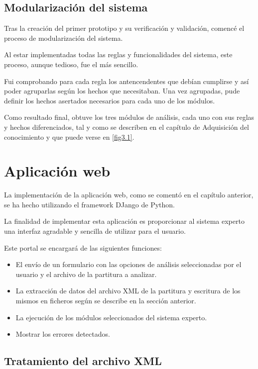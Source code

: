 \subsection{Modularización del sistema}

Tras la creación del primer prototipo y su verificación y validación, comencé el proceso de modularización del sistema. 

Al estar implementadas todas las reglas y funcionalidades del sistema, este proceso, aunque tedioso, fue el más sencillo. 

Fui comprobando para cada regla los antencendentes que debían cumplirse y así poder agruparlas según los hechos que necesitaban.
Una vez agrupadas, pude definir los hechos asertados necesarios para cada uno de los módulos.

Como resultado final, obtuve los tres módulos de análisis, cada uno con sus reglas y hechos diferenciados, tal y como se describen en el capítulo de Adquisición del conocimiento y que puede verse en \ref{fig3.1}. 

\section{Aplicación web}

La implementación de la aplicación web, como se comentó en el capítulo anterior, se ha hecho utilizando el framework DJango de Python.

La finalidad de implementar esta aplicación es proporcionar al sistema experto una interfaz agradable y sencilla de utilizar para el usuario. 

Este portal se encargará de las siguientes funciones:
\begin{itemize} 
	\item El envío de un formulario con las opciones de análisis seleccionadas por el usuario y el archivo de la partitura a analizar.
	\item La extracción de datos del archivo XML de la partitura y escritura de los mismos en ficheros según se describe en la sección anterior.
	\item La ejecución de los módulos seleccionados del sistema experto.
	\item Mostrar los errores detectados.
\end{itemize}

\subsection{Tratamiento del archivo XML}


